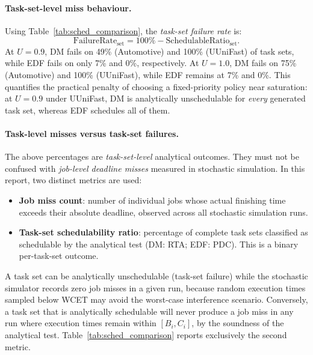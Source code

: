 \documentclass[12pt,a4paper]{article}
\begin{document}
\paragraph{Task-set-level miss behaviour.}
Using Table~\ref{tab:sched_comparison}, the \emph{task-set failure rate} is:
\begin{equation}
\text{FailureRate}_{\text{set}} = 100\% - \text{SchedulableRatio}_{\text{set}}.
\end{equation}
At \(U=0.9\), DM fails on 49\% (Automotive) and 100\% (UUniFast) of task sets, while EDF fails on only 7\% and 0\%, respectively. At \(U=1.0\), DM fails on 75\% (Automotive) and 100\% (UUniFast), while EDF remains at 7\% and 0\%. This quantifies the practical penalty of choosing a fixed-priority policy near saturation: at \(U=0.9\) under UUniFast, DM is analytically unschedulable for \emph{every} generated task set, whereas EDF schedules all of them.

\paragraph{Task-level misses versus task-set failures.}
The above percentages are \emph{task-set-level} analytical outcomes. They must not be confused with \emph{job-level deadline misses} measured in stochastic simulation. In this report, two distinct metrics are used:
\begin{itemize}
    \item \textbf{Job miss count}: number of individual jobs whose actual finishing time exceeds their absolute deadline, observed across all stochastic simulation runs.
    \item \textbf{Task-set schedulability ratio}: percentage of complete task sets classified as schedulable by the analytical test (DM: RTA; EDF: PDC). This is a binary per-task-set outcome.
\end{itemize}
A task set can be analytically unschedulable (task-set failure) while the stochastic simulator records zero job misses in a given run, because random execution times sampled below WCET may avoid the worst-case interference scenario. Conversely, a task set that is analytically schedulable will never produce a job miss in any run where execution times remain within \([B_i, C_i]\), by the soundness of the analytical test. Table~\ref{tab:sched_comparison} reports exclusively the second metric.
\end{document}
